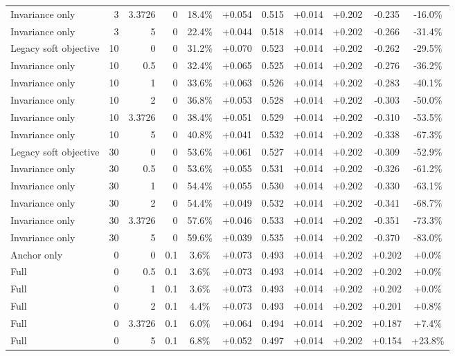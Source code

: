 \begin{table}[htbp]
\begin{tabular}{lrrrccccccc}
Invariance only & 3 & 3.3726 & 0 & 18.4\% & +0.054 & 0.515 & +0.014 & +0.202 & -0.235 & -16.0\% \\
Invariance only & 3 & 5 & 0 & 22.4\% & +0.044 & 0.518 & +0.014 & +0.202 & -0.266 & -31.4\% \\
Legacy soft objective & 10 & 0 & 0 & 31.2\% & +0.070 & 0.523 & +0.014 & +0.202 & -0.262 & -29.5\% \\
Invariance only & 10 & 0.5 & 0 & 32.4\% & +0.065 & 0.525 & +0.014 & +0.202 & -0.276 & -36.2\% \\
Invariance only & 10 & 1 & 0 & 33.6\% & +0.063 & 0.526 & +0.014 & +0.202 & -0.283 & -40.1\% \\
Invariance only & 10 & 2 & 0 & 36.8\% & +0.053 & 0.528 & +0.014 & +0.202 & -0.303 & -50.0\% \\
Invariance only & 10 & 3.3726 & 0 & 38.4\% & +0.051 & 0.529 & +0.014 & +0.202 & -0.310 & -53.5\% \\
Invariance only & 10 & 5 & 0 & 40.8\% & +0.041 & 0.532 & +0.014 & +0.202 & -0.338 & -67.3\% \\
Legacy soft objective & 30 & 0 & 0 & 53.6\% & +0.061 & 0.527 & +0.014 & +0.202 & -0.309 & -52.9\% \\
Invariance only & 30 & 0.5 & 0 & 53.6\% & +0.055 & 0.531 & +0.014 & +0.202 & -0.326 & -61.2\% \\
Invariance only & 30 & 1 & 0 & 54.4\% & +0.055 & 0.530 & +0.014 & +0.202 & -0.330 & -63.1\% \\
Invariance only & 30 & 2 & 0 & 54.4\% & +0.049 & 0.532 & +0.014 & +0.202 & -0.341 & -68.7\% \\
Invariance only & 30 & 3.3726 & 0 & 57.6\% & +0.046 & 0.533 & +0.014 & +0.202 & -0.351 & -73.3\% \\
Invariance only & 30 & 5 & 0 & 59.6\% & +0.039 & 0.535 & +0.014 & +0.202 & -0.370 & -83.0\% \\
Anchor only & 0 & 0 & 0.1 & 3.6\% & +0.073 & 0.493 & +0.014 & +0.202 & +0.202 & +0.0\% \\
Full & 0 & 0.5 & 0.1 & 3.6\% & +0.073 & 0.493 & +0.014 & +0.202 & +0.202 & +0.0\% \\
Full & 0 & 1 & 0.1 & 3.6\% & +0.073 & 0.493 & +0.014 & +0.202 & +0.202 & +0.0\% \\
Full & 0 & 2 & 0.1 & 4.4\% & +0.073 & 0.493 & +0.014 & +0.202 & +0.201 & +0.8\% \\
Full & 0 & 3.3726 & 0.1 & 6.0\% & +0.064 & 0.494 & +0.014 & +0.202 & +0.187 & +7.4\% \\
Full & 0 & 5 & 0.1 & 6.8\% & +0.052 & 0.497 & +0.014 & +0.202 & +0.154 & +23.8\% \\

\end{tabular}
\end{table}
